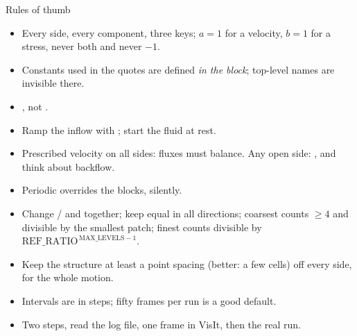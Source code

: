 \documentclass[aspectratio=169,11pt]{beamer}
\begin{document}
\begin{frame}{Rules of thumb}
\label{fr:thumb}
\small
\begin{itemize}
  \item Every side, every component, three keys; $a = 1$ for a velocity, $b = 1$ for a stress, never both and never $-1$.
  \item Constants used in the quotes are defined \emph{in the block}; top-level names are invisible there.
  \item {}, not .
  \item Ramp the inflow with ; start the fluid at rest.
  \item Prescribed velocity on all sides: fluxes must balance. Any open side: , and think about backflow.
  \item Periodic overrides the blocks, silently.
  \item Change / and  together; keep  equal in all directions; coarsest counts $\ge 4$ and divisible by the smallest patch; finest counts divisible by $\mathrm{REF\_RATIO}^{\,\mathrm{MAX\_LEVELS}-1}$.
  \item Keep the structure at least a point spacing (better: a few cells) off every side, for the whole motion.
  \item Intervals are in steps; fifty frames per run is a good default.
  \item Two steps, read the log file, one frame in VisIt, then the real run.
\end{itemize}
\end{frame}
\end{document}
